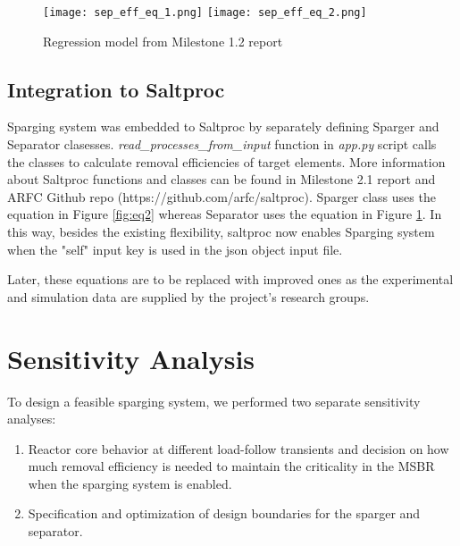     \begin{figure}[htbp!]
        \begin{center}
            \texttt{[image: sep\_eff\_eq\_1.png]}
            \texttt{[image: sep\_eff\_eq\_2.png]}
        \end{center}
        \caption{Regression model from Milestone 1.2 report}
        \label{fig:reg_model}
    \end{figure}

\newpage
\FloatBarrier

\subsection{Integration to Saltproc}

    Sparging system was embedded to Saltproc by separately defining Sparger and 
    Separator clasesses. \textit{read\_processes\_from\_input} function in 
    \textit{app.py} script calls the classes to calculate removal efficiencies 
    of target elements. More information about Saltproc functions and classes 
    can be found in Milestone 2.1 report \cite{rykhlevskii_milestone_2019} and 
    ARFC Github repo (https://github.com/arfc/saltproc). Sparger class uses the 
    equation in Figure \ref{fig:eq2} whereas Separator uses the equation in 
    Figure \ref{fig:reg_model}. In this way, besides the existing flexibility, 
    saltproc now enables Sparging system when the "self" input key is used in 
    the json object input file.

    Later, these equations are to be replaced with improved ones as the 
    experimental and simulation data are supplied by the project's research 
    groups.

\newpage
\FloatBarrier

\section{Sensitivity Analysis}

    To design a feasible sparging system, we performed two separate sensitivity 
    analyses:

    \begin{enumerate}
        \item Reactor core behavior at different load-follow transients and 
                decision on how much removal efficiency is needed to maintain 
                    the criticality in the MSBR when the sparging system is 
                    enabled.
        \item Specification and optimization of design boundaries for the 
                sparger and separator.
    \end{enumerate}

